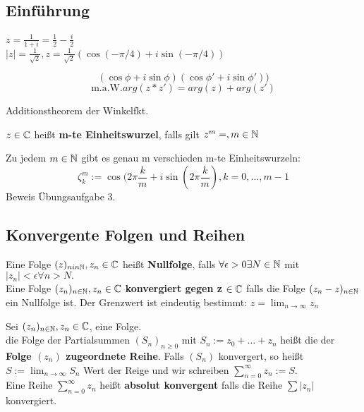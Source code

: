 \subsection{Einführung}

\begin{beispiel}
$z = \frac{1}{1+i} = \frac{1}{2} - \frac{i}{2}$\\
$|z| = \frac{1}{\sqrt{2}}, z = \frac{1}{\sqrt{2}}(\cos(-\pi/4)+i\sin(-\pi/4))$
\end{beispiel}

\begin{lemma}
\[
(\cos\phi + i\sin\phi)(\cos\phi\prime + i\sin\phi\prime))
\]
\[ \text{m.a.W}. arg(z*z\prime) = arg(z)+ arg(z\prime)
\]
\end{lemma}

\begin{bew}
Additionstheorem der Winkelfkt.
\end{bew}
\begin{bemerkung}
\end{bemerkung}

\begin{definition}
$z \in \mathbb{C} $ heißt \textbf{m-te Einheitswurzel}, falls gilt $z^m = , m \in \mathbb{N}$
\end{definition}
\begin{satz}
Zu jedem $m \in \mathbb{N}$ gibt es genau m verschieden m-te Einheitswurzeln:
\[
\zeta^m_k := \cos(2\pi\frac{k}{m}+i\sin(2\pi\frac{k}{m}), k=0,\dots,m-1
\]
Beweis Übungsaufgabe 3.
\end{satz}

\subsection{Konvergente Folgen und Reihen}
\begin{definition}
Eine Folge $(z)_{nin \mathbb{N}}, z_n \in \mathbb{C}$ heißt \textbf{Nullfolge}, falls $\forall \epsilon > 0 \exists N \in \mathbb{N}$ mit $|z_n| < \epsilon \forall n>N.$ \\
Eine Folge $(z_n)_{n\in \mathbb{N}}, z_n \in \mathbb{C}$ \textbf{konvergiert gegen z} $\in \mathbb{C}$
falls die Folge $(z_n-z)_{n\in \mathbb{N}}$ ein Nullfolge ist. Der Grenzwert ist eindeutig bestimmt: $z = \lim_{n \to \infty}z_n$
\end{definition}

\begin{bemerkung}
\end{bemerkung}

\begin{definition}
Sei $(z_n)_{n\in\mathbb{N}}, z_n \in \mathbb{C}$, eine Folge.\\
die Folge der Partialsummen $(S_n)_{n\geq 0}$ mit $S_n := z_0+\dots+z_n$ heißt die der \textbf{Folge $(z_n)$ zugeordnete Reihe}.
Falls $(S_n)$ konvergert, so heißt $ S:=\lim_{n\to \infty} S_n$ Wert der Reige und wir schreiben $\sum^\infty_{n=0}z_n := S.$\\
Eine Reihe $\sum^\infty_{n=0} z_n$ heißt \textbf{absolut konvergent} falls die Reihe 
$\sum |z_n|$ konvergiert.
\end{definition}

